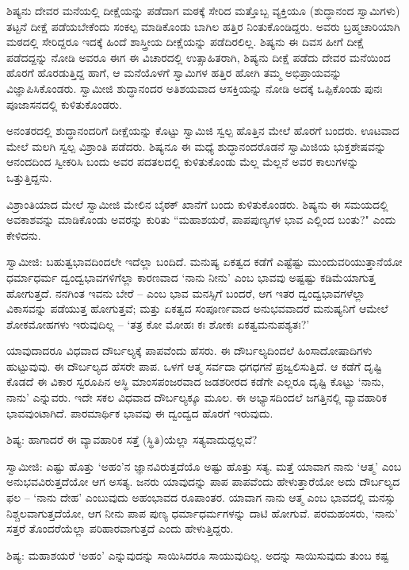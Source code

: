ಶಿಷ್ಯನು ದೇವರ ಮನೆಯಲ್ಲಿ ದೀಕ್ಷೆಯನ್ನು ಪಡೆದಾಗ ಮಠಕ್ಕೆ ಸೇರಿದ ಮತ್ತೊಬ್ಬ ವ್ಯಕ್ತಿಯೂ (ಶುದ್ಧಾನಂದ ಸ್ವಾಮಿಗಳು) ತಟ್ಟನೆ ದೀಕ್ಷೆ ಪಡೆಯಬೇಕೆಂದು ಸಂಕಲ್ಪ ಮಾಡಿಕೊಂಡು ಬಾಗಿಲ ಹತ್ತಿರ ನಿಂತುಕೊಂಡಿದ್ದರು. ಅವರು ಬ್ರಹ್ಮಚಾರಿಯಾಗಿ ಮಠದಲ್ಲಿ ಸೇರಿದ್ದರೂ ಇದಕ್ಕೆ ಹಿಂದೆ ಶಾಸ್ತ್ರೀಯ ದೀಕ್ಷೆಯನ್ನು ಪಡೆದಿರಲಿಲ್ಲ. ಶಿಷ್ಯನು ಈ ದಿವಸ ಹೀಗೆ ದೀಕ್ಷೆ ಪಡೆದದ್ದನ್ನು ನೋಡಿ ಅವರೂ ಈಗ ಈ ವಿಚಾರದಲ್ಲಿ ಉತ್ಸಾಹಿತರಾಗಿ, ಶಿಷ್ಯನು ದೀಕ್ಷೆ ಪಡೆದು ದೇವರ ಮನೆಯಿಂದ ಹೊರಗೆ ಹೊರಡುತ್ತಿದ್ದ ಹಾಗೆ, ಆ ಮನೆಯೊಳಗೆ ಸ್ವಾಮಿಗಳ ಹತ್ತಿರ ಹೋಗಿ ತಮ್ಮ ಅಭಿಪ್ರಾಯವನ್ನು ವಿಜ್ಞಾಪಿಸಿಕೊಂಡರು. ಸ್ವಾಮೀಜಿ ಶುದ್ಧಾನಂದರ ಅತಿಶಯವಾದ ಆಸಕ್ತಿಯನ್ನು ನೋಡಿ ಅದಕ್ಕೆ ಒಪ್ಪಿಕೊಂಡು ಪುನಃ ಪೂಜಾಸನದಲ್ಲಿ ಕುಳಿತುಕೊಂಡರು.

ಅನಂತರದಲ್ಲಿ ಶುದ್ಧಾನಂದರಿಗೆ ದೀಕ್ಷೆಯನ್ನು ಕೊಟ್ಟು ಸ್ವಾಮಿಜಿ ಸ್ವಲ್ಪ ಹೊತ್ತಿನ ಮೇಲೆ ಹೊರಗೆ ಬಂದರು. ಊಟವಾದ ಮೇಲೆ ಮಲಗಿ ಸ್ವಲ್ಪ ವಿಶ್ರಾಂತಿ ಪಡೆದರು. ಶಿಷ್ಯನೂ ಈ ಮಧ್ಯೆ ಶುದ್ಧಾನಂದರೊಡನೆ ಸ್ವಾಮಿಜಿಯ ಭುಕ್ತಶೇಷವನ್ನು ಆನಂದದಿಂದ ಸ್ವೀಕರಿಸಿ ಬಂದು ಅವರ ಪದತಲದಲ್ಲಿ ಕುಳಿತುಕೊಂಡು ಮೆಲ್ಲ ಮೆಲ್ಲನೆ ಅವರ ಕಾಲುಗಳನ್ನು ಒತ್ತುತ್ತಿದ್ದನು.

ವಿಶ್ರಾಂತಿಯಾದ ಮೇಲೆ ಸ್ವಾಮೀಜಿ ಮೇಲಿನ ಬೈಠಕ್ ಖಾನೆಗೆ ಬಂದು ಕುಳಿತುಕೊಂಡರು. ಶಿಷ್ಯನು ಈ ಸಮಯದಲ್ಲಿ ಅವಕಾಶವನ್ನು ಮಾಡಿಕೊಂಡು ಅವರನ್ನು ಕುರಿತು “ಮಹಾಶಯರೆ, ಪಾಪಪುಣ್ಯಗಳ ಭಾವ ಎಲ್ಲಿಂದ ಬಂತು?" ಎಂದು ಕೇಳಿದನು.

ಸ್ವಾಮೀಜಿ: ಬಹುತ್ವಭಾವದಿಂದಲೇ ಇದೆಲ್ಲಾ ಬಂದಿದೆ. ಮನುಷ್ಯ ಏಕತ್ವದ ಕಡೆಗೆ ಎಷ್ಟೆಷ್ಟು ಮುಂದುವರಿಯುತ್ತಾನೆಯೋ ಧರ್ಮಾಧರ್ಮ ದ್ವಂದ್ವಭಾವಗಳಿಗೆಲ್ಲಾ ಕಾರಣವಾದ ‘ನಾನು ನೀನು’ ಎಂಬ ಭಾವವು ಅಷ್ಟಷ್ಟು ಕಡಿಮೆಯಾಗುತ್ತ ಹೋಗುತ್ತದೆ. ನನಗಿಂತ ಇವನು ಬೇರೆ – ಎಂಬ ಭಾವ ಮನಸ್ಸಿಗೆ ಬಂದರೆ, ಆಗ ಇತರ ದ್ವಂದ್ವಭಾವಗಳೆಲ್ಲಾ ವಿಕಾಸವನ್ನು ಪಡೆಯುತ್ತ ಹೋಗುತ್ತವೆ; ಮತ್ತು ಏಕತ್ವದ ಸಂಪೂರ್ಣವಾದ ಅನುಭವವಾದರೆ ಮನುಷ್ಯನಿಗೆ ಆಮೇಲೆ ಶೋಕಮೋಹಗಳು ಇರುವುದಿಲ್ಲ – ‘ತತ್ರ ಕೋ ಮೋಹಃ ಕಃ ಶೋಕಃ ಏಕತ್ವಮನುಪಶ್ಯತಃ?’

ಯಾವುದಾದರೂ ವಿಧವಾದ ದೌರ್ಬಲ್ಯಕ್ಕೆ ಪಾಪವೆಂದು ಹೆಸರು. ಈ ದೌರ್ಬಲ್ಯದಿಂದಲೆ ಹಿಂಸಾದೋಷಾದಿಗಳು ಹುಟ್ಟುವುವು. ಈ ದೌರ್ಬಲ್ಯದ ಹೆಸರೇ ಪಾಪ. ಒಳಗೆ ಆತ್ಮ ಸರ್ವದಾ ಧಗಧಗನೆ ಪ್ರಜ್ವಲಿಸುತ್ತಿದೆ. ಆ ಕಡೆಗೆ ದೃಷ್ಟಿ ಕೊಡದೆ ಈ ವಿಕಾರ ಸ್ವರೂಪಿನ ಅಸ್ಥಿ ಮಾಂಸಪಂಜರವಾದ ಜಡಶರೀರದ ಕಡೆಗೇ ಎಲ್ಲರೂ ದೃಷ್ಟಿ ಕೊಟ್ಟು ‘ನಾನು, ನಾನು’ ಎನ್ನುವರು. ಇದೇ ಸಕಲ ವಿಧವಾದ ದೌರ್ಬಲ್ಯಕ್ಕೂ ಮೂಲ. ಈ ಅಭ್ಯಾಸದಿಂದಲೆ ಜಗತ್ತಿನಲ್ಲಿ ವ್ಯಾವಹಾರಿಕ ಭಾವವುಂಟಾಗಿದೆ. ಪಾರಮಾರ್ಥಿಕ ಭಾವವು ಈ ದ್ವಂದ್ವದ ಹೊರಗೆ ಇರುವುದು.

ಶಿಷ್ಯ: ಹಾಗಾದರೆ ಈ ವ್ಯಾವಹಾರಿಕ ಸತ್ತೆ (ಸ್ಥಿತಿ)ಯೆಲ್ಲಾ ಸತ್ಯವಾದುದ್ದಲ್ಲವೆ?

ಸ್ವಾಮೀಜಿ: ಎಷ್ಟು ಹೊತ್ತು ‘ಅಹಂ’ನ ಜ್ಞಾನವಿರುತ್ತದೆಯೊ ಅಷ್ಟು ಹೊತ್ತು ಸತ್ಯ. ಮತ್ತೆ ಯಾವಾಗ ನಾನು ‘ಆತ್ಮ’ ಎಂಬ ಅನುಭವವಿರುತ್ತದೆಯೋ ಆಗ ಅಸತ್ಯ. ಜನರು ಯಾವುದನ್ನು ಪಾಪ ಪಾಪವೆಂದು ಹೇಳುತ್ತಾರೆಯೋ ಅದು ದೌರ್ಬಲ್ಯದ ಫಲ – ‘ನಾನು ದೇಹ’ ಎಂಬುವುದು ಅಹಂಭಾವದ ರೂಪಾಂತರ. ಯಾವಾಗ ನಾನು ಆತ್ಮ ಎಂಬ ಭಾವದಲ್ಲಿ ಮನಸ್ಸು ನಿಶ್ಚಲವಾಗುತ್ತದೆಯೋ, ಆಗ ನೀನು ಪಾಪ ಪುಣ್ಯ ಧರ್ಮಾಧರ್ಮಗಳನ್ನು ದಾಟಿ ಹೋಗುವೆ. ಪರಮಹಂಸರು, ‘ನಾನು’ ಸತ್ತರೆ ತೊಂದರೆಯೆಲ್ಲಾ ಪರಿಹಾರವಾಗುತ್ತದೆ ಎಂದು ಹೇಳುತ್ತಿದ್ದರು.

ಶಿಷ್ಯ: ಮಹಾಶಯರೆ ‘ಅಹಂ’ ಎನ್ನುವುದನ್ನು ಸಾಯಿಸಿದರೂ ಸಾಯುವುದಿಲ್ಲ. ಅದನ್ನು ಸಾಯಿಸುವುದು ತುಂಬ ಕಷ್ಟ

